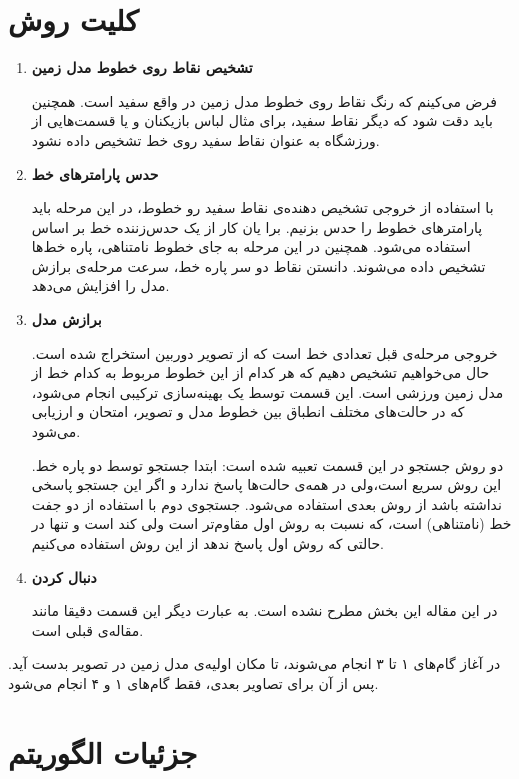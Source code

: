 \documentclass{report}
\begin{document}
\section{کلیت روش}
\begin{enumerate}
\item \textbf{تشخیص نقاط روی خطوط مدل زمین}

فرض می‌کینم که رنگ نقاط روی خطوط مدل زمین در واقع سفید است. همچنین باید دقت شود که دیگر نقاط سفید، برای مثال لباس بازیکنان و یا قسمت‌هایی از ورزشگاه به عنوان نقاط سفید روی خط تشخیص داده نشود.
\item \textbf{حدس پارامترهای خط}

با استفاده از خروجی تشخیص دهنده‌ی نقاط سفید رو خطوط، در این مرحله باید پارامترهای خطوط را حدس بزنیم. برا یان کار از یک حدس‌زننده خط بر اساس  استفاده می‌شود. همچنین در این مرحله به جای خطوط نامتناهی، پاره خط‌ها تشخیص داده می‌شوند. دانستن نقاط دو سر پاره خط، سرعت مرحله‌ی برازش مدل را افزایش می‌دهد.
\item \textbf{برازش مدل}

خروجی مرحله‌ی قبل تعدادی خط است که از تصویر دوربین استخراج شده است. حال می‌خواهیم تشخیص دهیم که هر کدام از این خطوط مربوط به کدام خط از مدل زمین ورزشی است. این قسمت توسط یک بهینه‌سازی ترکیبی انجام می‌شود، که در حالت‌های مختلف انطباق بین خطوط مدل و تصویر، امتحان و ارزیابی می‌شود. 

دو روش جستجو در این قسمت تعبیه شده است: ابتدا جستجو توسط دو پاره خط. این روش سریع است،‌ولی در همه‌ی حالت‌ها پاسخ ندارد و اگر این جستجو پاسخی نداشته باشد از روش بعدی استفاده می‌شود. جستجوی دوم با استفاده از دو جفت خط (نامتناهی) است، که نسبت به روش اول مقاوم‌تر است ولی کند است و تنها در حالتی که روش اول پاسخ ندهد از این روش استفاده می‌کنیم.
\item \textbf{دنبال کردن}

در این مقاله این بخش مطرح نشده است. به عبارت دیگر این قسمت دقیقا مانند مقاله‌ی قبلی\cite{old_paper} است.
\end{enumerate}

در آغاز گام‌های ۱ تا ۳ انجام می‌شوند، تا مکان اولیه‌ی مدل زمین در تصویر بدست آید. پس از آن برای تصاویر بعدی، فقط گام‌های ۱ و ۴ انجام می‌شود.

\section{جزئیات الگوریتم}

\begin{latin}
{}

\end{latin}
\end{document}

